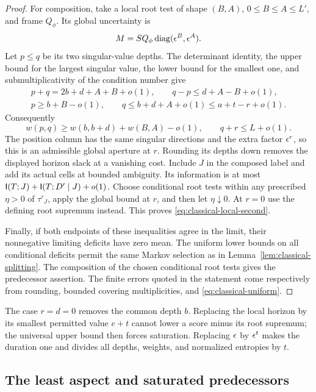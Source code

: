 \begin{proof}
For composition, take a local root test of shape $(B,A)$,
$0\le B\le A\le L'$, and frame $Q_\phi$.  Its global uncertainty is
\[
 M=S Q_\phi\operatorname{diag}(\epsilon^B,\epsilon^A).
\]
Let $p\le q$ be its two singular-value depths.  The determinant identity,
the upper bound for the largest singular value, the lower bound for the
smallest one, and submultiplicativity of the condition number give
\begin{gather*}
 p+q=2b+d+A+B+o(1),\qquad
 q-p\le d+A-B+o(1),\\
 p\ge b+B-o(1),\qquad
 q\le b+d+A+o(1)\le a+t-r+o(1).
\end{gather*}
Consequently
\[
 w(p,q)\ge w(b,b+d)+w(B,A)-o(1),\qquad q+r\le L+o(1).
\]
The position column has the same singular directions and the extra
factor $\epsilon^r$, so this is an admissible global aperture at $r$.
Rounding its depths down removes the displayed horizon slack at a
vanishing cost.  Include $J$ in the composed label and add its actual
cells at bounded ambiguity.  Its information is at most
$\mathsf I(T;J)+\mathsf I(T;D'\mid J)+o(1)$.
Choose conditional root tests within any prescribed $\eta>0$ of
$\tau'_J$, apply the global bound at $r$, and then let $\eta\downarrow0$.
At $r=0$ use the defining root supremum instead.  This proves
\eqref{eq:classical-local-second}.

Finally, if both endpoints of these inequalities agree in the limit,
their nonnegative limiting deficits have zero mean.  The uniform lower
bounds on all conditional deficits permit the same Markov selection as
in Lemma~\ref{lem:classical-splitting}.  The composition of the chosen
conditional root tests gives the predecessor assertion.  The finite
errors quoted in the statement come respectively from rounding,
bounded covering multiplicities, and \eqref{eq:classical-uniform}.
\end{proof}



The case $r=d=0$ removes the common depth $b$.  Replacing the local
horizon by its smallest permitted value $e+t$ cannot lower a score
minus its root supremum; the universal upper bound then forces
saturation.  Replacing $\epsilon$ by $\epsilon^t$ makes the duration one and
divides all depths, weights, and normalized entropies by $t$.

\subsection{The least aspect and saturated predecessors}

